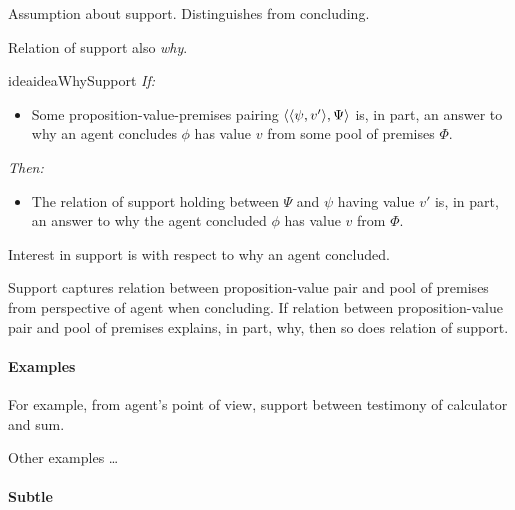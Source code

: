 \begin{note}
  Assumption about support.
  Distinguishes from concluding.

  Relation of support also \emph{why}.

  \begin{restatable}{idea}{ideaWhySupport}
    \label{assu:why:pvpp:support}
    \emph{If:}
    \begin{itemize}
    \item
      Some proposition-value-premises pairing \(\langle \langle \psi, v' \rangle, \Psi \rangle\) is, in part, an answer to why an agent concludes \(\phi\) has value \(v\) from some pool of premises \(\Phi\).
    \end{itemize}
    \emph{Then:}
    \begin{itemize}
    \item
      The relation of support holding between \(\Psi\) and \(\psi\) having value \(v'\) is, in part, an answer to why the agent concluded \(\phi\) has value \(v\) from \(\Phi\).
    \end{itemize}
    \vspace{-\baselineskip}
  \end{restatable}
\end{note}

\begin{note}
  Interest in support is with respect to why an agent concluded.

  Support captures relation between proposition-value pair and pool of premises from perspective of agent when concluding.
  If relation between proposition-value pair and pool of premises explains, in part, why, then so does relation of support.
\end{note}

\paragraph{Examples}

\begin{note}
  For example, from agent's point of view, support between testimony of calculator and sum.

  Other examples \dots
\end{note}


\paragraph{Subtle}

